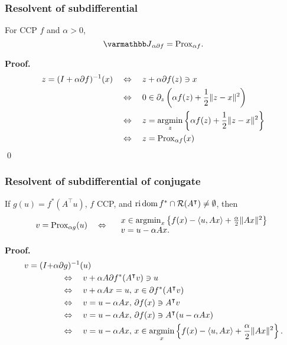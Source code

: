\documentclass[10pt,mathserif]{beamer}
\begin{document}
\begin{frame}
\frametitle{Resolvent of subdifferential}
For CCP $f$ and $\alpha>0$,
\[
\opJ_{\alpha \partial f}=\prox_{\alpha f}.
\]

\vspace{0.2in}
\textbf{Proof.}
\begin{align*}
z = (I+\alpha \partial f)^{-1}(x)
\quad&\Leftrightarrow\quad
z +\alpha \partial f(z)  \ni x\\
&\Leftrightarrow\quad
0 \in \partial_z \left(\alpha f(z) + \frac{1}{2}\|z-x\|^2\right)\\
&\Leftrightarrow\quad
z = \operatorname*{argmin}_z
\left\{\alpha f(z) + \frac{1}{2}\|z-x\|^2\right\}\\
&\Leftrightarrow\quad
z =\mathrm{Prox}_{\alpha f}(x)
\end{align*}
\qed
\end{frame}


\begin{frame}[label=res_subdiff_conj]
\frametitle{Resolvent of subdifferential of conjugate}
If $g(u)=f^*(A^\intercal u)$, $f$ CCP, and $ \mathrm{ri}\,\mathrm{dom}\, f^*\cap {\mathcal{R}}(A^\intercal)\ne \emptyset$,
then
\begin{align*}
v=\mathrm{Prox}_{\alpha g}(u)
\quad\Leftrightarrow\quad
\begin{array}{l}
x\in\operatorname*{argmin}_x\left\{
f(x)-\langle u,Ax\rangle +\frac{\alpha}{2}\|Ax\|^2
\right\}\\
v= u-\alpha Ax.
\end{array}
\end{align*}

\vspace{0.2in}

\textbf{Proof.}
\begin{align*}
v= (I+&\alpha\partial g)^{-1}(u)\\
&\quad\Leftrightarrow\quad
v+\alpha A\partial f^*(A^\intercal v)\ni u\\
&\quad\Leftrightarrow\quad
v+\alpha Ax= u,\,x\in \partial f^*(A^\intercal v)\\
&\quad\Leftrightarrow\quad
v= u-\alpha Ax,\,\partial f(x)\ni  A^\intercal v\\ %
&\quad\Leftrightarrow\quad
v= u-\alpha Ax,\,\partial f(x)\ni  A^\intercal(u-\alpha Ax)\\
&\quad\Leftrightarrow\quad
v= u-\alpha Ax,\,x\in
\argmin_x\left\{
f(x)-\langle u,Ax\rangle +\frac{\alpha}{2}\|Ax\|^2
\right\}.
\end{align*}
\end{frame}
\end{document}
